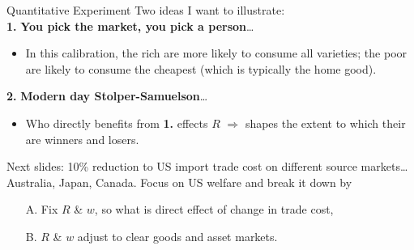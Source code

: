\documentclass[9pt,pdftex,aspectratio=1610]{beamer}
\theoremstyle{definition}
\begin{document}

\begin{frame}[t]{Quantitative Experiment}
\smallskip
Two ideas I want to illustrate:\\
\medskip
\textbf{1.} \textbf{You pick the market, you pick a person}\ldots
\begin{itemize}
  \item In this calibration, the rich are more likely to consume all varieties; the poor are likely to consume the cheapest (which is typically the home good).
\end{itemize}
\bigskip
\textbf{2.} \textbf{Modern day Stolper-Samuelson}\ldots
\begin{itemize}
\item Who directly benefits from \textbf{1.} effects $R$ $\Rightarrow$ shapes the extent to which their are winners and losers.
\end{itemize}
\bigskip
Next slides: 10\% reduction to US import trade cost on different source markets\ldots Australia, Japan, Canada. Focus on US welfare and break it down by
\begin{itemize}
\item[A.] Fix $R$ \& $w$, so what is direct effect of change in trade cost,
\smallskip
\item[B.] $R$ \& $w$ adjust to clear goods and asset markets.
\end{itemize}
\end{frame}

\end{document}
